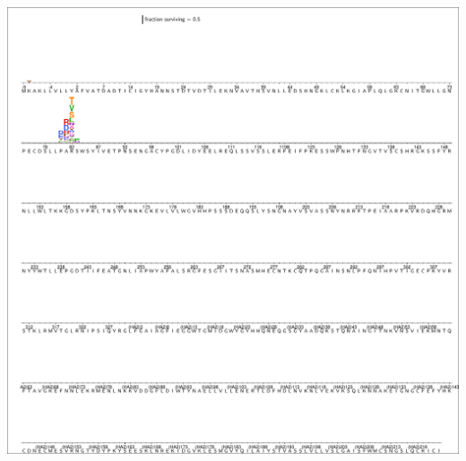 \documentclass[11pt]{article}
\begin{document}
\begin{suppfigure}
\centerline{\includegraphics[trim=0.1cm 0.02cm 0.1cm 0.03cm,clip=true,width=\textwidth]{figs/logoplots/H17L7_fracsurvive.pdf}}
\caption{\label{suppfig:H17L7logo}
{\bf The excess fraction surviving selection with antibody H17L7 for all amino-acid mutations.}
The excess fraction surviving for each replicate was computed using Equation~\ref{eq:fracsurvive_excess}, then we took the median across all technical and biological replicates for each antibody concentration, and then took the medians of those values across concentrations.
The height of each letter is proportional to the excess fraction surviving of virions with that mutation.
The scale bar at the top of the plot relates the letter heights to the actual fractions.
The sites are labeled using H3 numbering.
}
\end{suppfigure}
\end{document}
